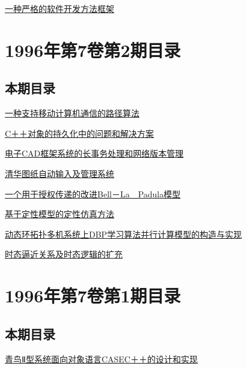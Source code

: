 \documentclass[a4paper]{article}
\begin{document}
\href{http://www.jos.org.cn/ch/reader/download_pdf.aspx?file_no=19960310&year_id=1996&quarter_id=3&falg=1}{一种严格的软件开发方法框架}


\section{\textbf{1996年第7卷第2期目录}}
\subsection{本期目录}
\href{http://www.jos.org.cn/ch/reader/download_pdf.aspx?file_no=19960201&year_id=1996&quarter_id=2&falg=1}{一种支持移动计算机通信的路径算法}

\href{http://www.jos.org.cn/ch/reader/download_pdf.aspx?file_no=19960202&year_id=1996&quarter_id=2&falg=1}{C＋＋对象的持久化中的问题和解决方案}

\href{http://www.jos.org.cn/ch/reader/download_pdf.aspx?file_no=19960203&year_id=1996&quarter_id=2&falg=1}{电子CAD框架系统的长事务处理和网络版本管理}

\href{http://www.jos.org.cn/ch/reader/download_pdf.aspx?file_no=19960204&year_id=1996&quarter_id=2&falg=1}{清华图纸自动输入及管理系统}

\href{http://www.jos.org.cn/ch/reader/download_pdf.aspx?file_no=19960205&year_id=1996&quarter_id=2&falg=1}{一个用于授权传递的改进Bell－La　Padula模型}

\href{http://www.jos.org.cn/ch/reader/download_pdf.aspx?file_no=19960206&year_id=1996&quarter_id=2&falg=1}{基于定性模型的定性仿真方法}

\href{http://www.jos.org.cn/ch/reader/download_pdf.aspx?file_no=19960207&year_id=1996&quarter_id=2&falg=1}{动态环拓扑多机系统上DBP学习算法并行计算模型的构造与实现}

\href{http://www.jos.org.cn/ch/reader/download_pdf.aspx?file_no=19960208&year_id=1996&quarter_id=2&falg=1}{时态逼近关系及时态逻辑的扩充}


\section{\textbf{1996年第7卷第1期目录}}
\subsection{本期目录}
\href{http://www.jos.org.cn/ch/reader/download_pdf.aspx?file_no=19960101&year_id=1996&quarter_id=1&falg=1}{青鸟Ⅱ型系统面向对象语言CASEC＋＋的设计和实现}
\end{document}
